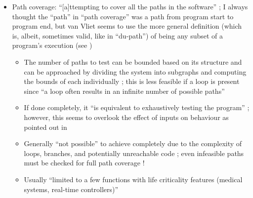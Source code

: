\begin{itemize}
\begin{itemize}
            \end{itemize}
      \item Path coverage: ``[a]ttempting to cover all the paths in the
            software'' \cite[p.~119]{patton_software_2006};
            I always thought the ``path'' in ``path coverage'' was
            a path from program start to program end, but van
            Vliet seems to use the more general definition (which
            is, albeit, sometimes valid, like in ``du-path'') of
            being any subset of a program's execution (see
            \cite[p.~420]{van_vliet_software_2000})
            \begin{itemize}
                  \item The number of paths to test can be bounded based on its
                        structure and can be approached by dividing the system
                        into subgraphs and computing the bounds of each
                        individually \cite[p.~471-473]{peters_software_2000};
                        this is less feasible if a loop is present
                        \cite[p.~473-476]{peters_software_2000} since ``a loop
                        often results in an infinite number of possible paths''
                        \cite[p.~421]{van_vliet_software_2000}
                  \item If done completely, it ``is equivalent to exhaustively
                        testing the program'' \cite[p.~421]{van_vliet_software_2000};
                        however, this seems to overlook the effect of inputs on
                        behaviour as pointed out in
                        \cite[pp.~466-467]{peters_software_2000}
                  \item Generally ``not possible'' to achieve completely due to
                        the complexity of
                        loops, branches, and potentially unreachable code
                        \cite[p.~421]{van_vliet_software_2000}; even infeasible
                        paths must be checked for full path coverage
                        \cite[p.~439]{peters_software_2000}!
                  \item Usually ``limited to a few functions with life
                        criticality features (medical systems, real-time
                        controllers)'' \cite[p.~481]{peters_software_2000}
            \end{itemize}

\end{itemize}
